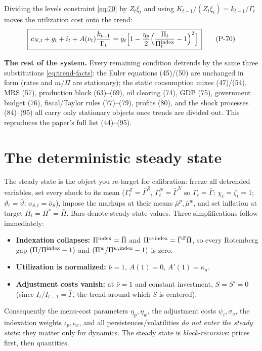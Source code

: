 Dividing the levels constraint \eqref{eq:70} by $Z_t\xi_t$ and using $K_{t-1}/(Z_t\xi_t)=k_{t-1}/\Gamma_t$
moves the utilization cost onto the trend:
\begin{equation}\label{eq:70d}
\boxed{\,c_{N,t}+g_t+i_t+A(\nu_t)\frac{k_{t-1}}{\Gamma_t}=y_t\Big[1-\frac{\eta_p}{2}\Big(\frac{\Pi_t}{\Pi^{\text{index}}_t}-1\Big)^2\Big]\,}\tag{P-70}
\end{equation}

\medskip\noindent
\textbf{The rest of the system.}
Every remaining condition detrends by the same three substitutions \eqref{eq:trend-facts}: the Euler
equations (45)/(50) are unchanged in form (rates and $m/\Pi$ are stationary); the static consumption
mixes (47)/(54), MRS (57), production block (63)--(69), oil clearing (74), GDP (75), government budget
(76), fiscal/Taylor rules (77)--(79), profits (80), and the shock processes (84)--(95) all carry only
stationary objects once trends are divided out. This reproduces the paper's full list (44)--(95).

\section{The deterministic steady state}\label{sec:ss}

The steady state is the object you re-target for calibration: freeze all detrended variables, set every
shock to its mean ($\Gamma^Z_t=\bar\Gamma^Z$, $\Gamma^N_t=\bar\Gamma^N$ so $\Gamma_t=\bar\Gamma$;
$\chi_t=\zeta_t=1$; $\vartheta_t=\bar\vartheta$; $o_{S,t}=\bar o_S$), impose the markups at their means
$\bar\mu^p,\bar\mu^w$, and set inflation at target $\Pi_t=\Pi^*=\bar\Pi$. Bars denote steady-state
values. Three simplifications follow immediately:
\begin{itemize}[nosep]
\item \textbf{Indexation collapses:} $\Pi^{\text{index}}=\bar\Pi$ and $\Pi^{w,\text{index}}=\bar\Gamma^Z\bar\Pi$, so
every Rotemberg gap $(\Pi/\Pi^{\text{index}}-1)$ and $(\Pi^w/\Pi^{w,\text{index}}-1)$ is zero.
\item \textbf{Utilization is normalized:} $\bar\nu=1$, $A(1)=0$, $A'(1)=\kappa_a$.
\item \textbf{Adjustment costs vanish:} at $\bar\nu=1$ and constant investment, $S=S'=0$ (since
$I_t/I_{t-1}=\bar\Gamma$, the trend around which $S$ is centered).
\end{itemize}
Consequently the menu-cost parameters $\eta_p,\eta_w$, the adjustment costs $\psi_i,\sigma_a$, the
indexation weights $\iota_p,\iota_w$, and all persistences/volatilities \emph{do not enter the steady
state}: they matter only for dynamics. The steady state is \emph{block-recursive}: prices first,
then quantities.

